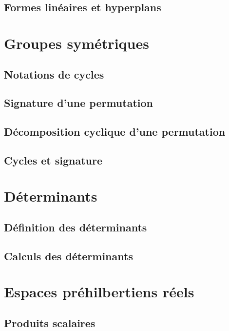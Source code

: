 \documentclass[11pt,twoside,a4paper]{article}
\begin{document}
\subsection{Formes linéaires et hyperplans}

\newpage
\section{Groupes symétriques}

\subsection{Notations de cycles}

\subsection{Signature d'une permutation}

\subsection{Décomposition cyclique d'une permutation}

\subsection{Cycles et signature}

\newpage
\section{Déterminants}

\subsection{Définition des déterminants}

\subsection{Calculs des déterminants}

\newpage
\section{Espaces préhilbertiens réels}

\subsection{Produits scalaires}
\end{document}
